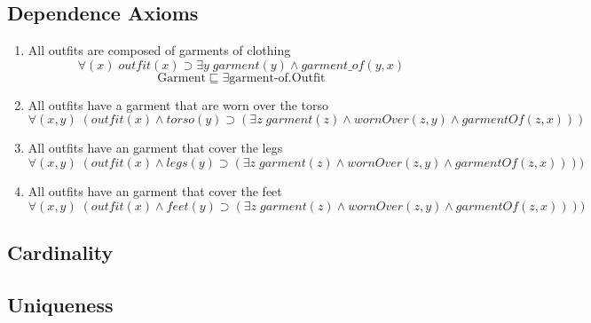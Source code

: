 \documentclass[paper=a4, fontsize=11pt]{scrartcl} %
\numberwithin{equation}{section} %
\numberwithin{figure}{section} %
\numberwithin{table}{section} %
\begin{document}
\subsection{Dependence Axioms}
\begin{enumerate}
	
	\item All outfits are composed of garments of clothing
	\begin{equation*}
		\forall(x) \; outfit(x) \supset \exists y \; garment(y) \land garment\_of(y,x)
	\end{equation*}
	\begin{equation*}
		\text{Garment} \sqsubseteq \exists \text{garment-of.Outfit}
	\end{equation*}
	
	\item All outfits have a garment that are worn over the torso
	\begin{equation*}
		\forall(x,y) \; (outfit(x) \land torso(y) \supset (\exists z \; garment(z) \land wornOver(z,y) \land garmentOf(z,x))) 
	\end{equation*}

	\item All outfits have an garment that cover the legs
	\begin{equation*}
		\forall(x,y) \; (outfit(x) \land legs(y) \supset (\exists z \; garment(z) \land wornOver(z,y) \land garmentOf(z,x)))) 
	\end{equation*}

	\item All outfits have an garment that cover the feet
	\begin{equation*}
		\forall(x,y) \; (outfit(x) \land feet(y) \supset (\exists z \; garment(z) \land wornOver(z,y) \land garmentOf(z,x)))) 
	\end{equation*}
	
\end{enumerate}

\subsection{Cardinality}

\subsection{Uniqueness}
\clearpage
\end{document}
